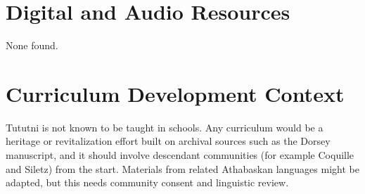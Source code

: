 \documentclass[12pt]{article}
\begin{document}
\section{Digital and Audio Resources}
None found.

\section{Curriculum Development Context}
Tututni is not known to be taught in schools. Any curriculum would be a heritage or revitalization effort built on archival sources such as the Dorsey manuscript, and it should involve descendant communities (for example Coquille and Siletz) from the start. Materials from related Athabaskan languages might be adapted, but this needs community consent and linguistic review.
\end{document}

